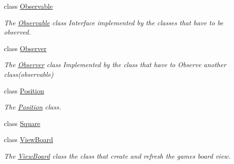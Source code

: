\begin{DoxyCompactItemize}
class \hyperlink{classoli_1_1_observable}{Observable}
\begin{DoxyCompactList}\small\item\em The \hyperlink{classoli_1_1_observable}{Observable} class Interface implemented by the classes that have to be observed. \end{DoxyCompactList}\item 
class \hyperlink{classoli_1_1_observer}{Observer}
\begin{DoxyCompactList}\small\item\em The \hyperlink{classoli_1_1_observer}{Observer} class Implemented by the class that have to Observe another class(observable) \end{DoxyCompactList}\item 
class \hyperlink{classoli_1_1_position}{Position}
\begin{DoxyCompactList}\small\item\em The \hyperlink{classoli_1_1_position}{Position} class. \end{DoxyCompactList}\item 
class \hyperlink{classoli_1_1_square}{Square}
\item 
class \hyperlink{classoli_1_1_view_board}{View\+Board}
\begin{DoxyCompactList}\small\item\em The \hyperlink{classoli_1_1_view_board}{View\+Board} class the class that create and refresh the game\textquotesingle{}s board view. \end{DoxyCompactList}\end{DoxyCompactItemize}
